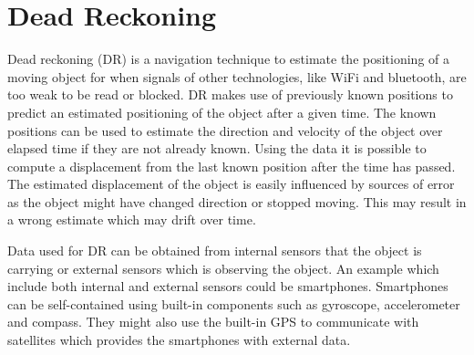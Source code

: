 \section{Dead Reckoning}
Dead reckoning (DR) \cite{DR} is a navigation technique to estimate the positioning of a moving object for when signals of other technologies, like WiFi and bluetooth, are too weak to be read or blocked.
DR makes use of previously known positions to predict an estimated positioning of the object after a given time.
The known positions can be used to estimate the direction and velocity of the object over elapsed time if they are not already known.
Using the data it is possible to compute a displacement from the last known position after the time has passed.
The estimated displacement of the object is easily influenced by sources of error as the object might have changed direction or stopped moving.
This may result in a wrong estimate which may drift over time.

Data used for DR can be obtained from internal sensors that the object is carrying or external sensors which is observing the object.
An example which include both internal and external sensors could be smartphones.
Smartphones can be self-contained using built-in components such as gyroscope, accelerometer and compass.
They might also use the built-in GPS to communicate with satellites which provides the smartphones with external data.